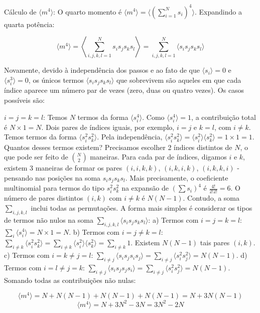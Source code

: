 \documentclass[12pt]{article}
\begin{document}
\newpage



Cálculo de $\langle m^4 \rangle$: O quarto momento é $\langle m^4 \rangle = \langle (\sum_{i=1}^{N} s_i)^4 \rangle$. Expandindo a quarta potência:

$$ \langle m^4 \rangle = \left\langle \sum_{i,j,k,l=1}^{N} s_i s_j s_k s_l \right\rangle = \sum_{i,j,k,l=1}^{N} \langle s_i s_j s_k s_l \rangle $$

Novamente, devido à independência dos passos e ao fato de que $\langle s_i \rangle = 0$ e $\langle s_i^3 \rangle = 0$, os únicos termos $\langle s_i s_j s_k s_l \rangle$ que sobrevivem são aqueles em que cada índice aparece um número par de vezes (zero, duas ou quatro vezes). Os casos possíveis são:

$i=j=k=l$: Temos $N$ termos da forma $\langle s_i^4 \rangle$. Como $\langle s_i^4 \rangle = 1$, a contribuição total é $N \times 1 = N$.
Dois pares de índices iguais, por exemplo, $i=j$ e $k=l$, com $i \neq k$. Temos termos da forma $\langle s_i^2 s_k^2 \rangle$. Pela independência, $\langle s_i^2 s_k^2 \rangle = \langle s_i^2 \rangle \langle s_k^2 \rangle = 1 \times 1 = 1$. Quantos desses termos existem? Precisamos escolher 2 índices distintos de $N$, o que pode ser feito de $\binom{N}{2}$ maneiras. Para cada par de índices, digamos $i$ e $k$, existem 3 maneiras de formar os pares $(i,i,k,k)$, $(i,k,i,k)$, $(i,k,k,i)$ - pensando nas posições na soma $s_i s_j s_k s_l$. Mais precisamente, o coeficiente multinomial para termos do tipo $s_i^2 s_k^2$ na expansão de $(\sum s_i)^4$ é $\frac{4!}{2!2!} = 6$. O número de pares distintos $(i, k)$ com $i \neq k$ é $N(N-1)$. Contudo, a soma $\sum_{i,j,k,l}$ inclui todas as permutações. A forma mais simples é considerar os tipos de termos não nulos na soma $\sum_{i,j,k,l} \langle s_i s_j s_k s_l \rangle$: a) Termos com $i=j=k=l$: $\sum_i \langle s_i^4 \rangle = N \times 1 = N$. b) Termos com $i=j \neq k=l$: $\sum_{i \neq k} \langle s_i^2 s_k^2 \rangle = \sum_{i \neq k} \langle s_i^2 \rangle \langle s_k^2 \rangle = \sum_{i \neq k} 1$. Existem $N(N-1)$ tais pares $(i, k)$. c) Termos com $i=k \neq j=l$: $\sum_{i \neq j} \langle s_i s_j s_i s_j \rangle = \sum_{i \neq j} \langle s_i^2 s_j^2 \rangle = N(N-1)$. d) Termos com $i=l \neq j=k$: $\sum_{i \neq j} \langle s_i s_j s_j s_i \rangle = \sum_{i \neq j} \langle s_i^2 s_j^2 \rangle = N(N-1)$.
Somando todas as contribuições não nulas:

$$ \langle m^4 \rangle = N + N(N-1) + N(N-1) + N(N-1) = N + 3N(N-1) $$ $$ \langle m^4 \rangle = N + 3N^2 - 3N = 3N^2 - 2N $$
\end{document}
